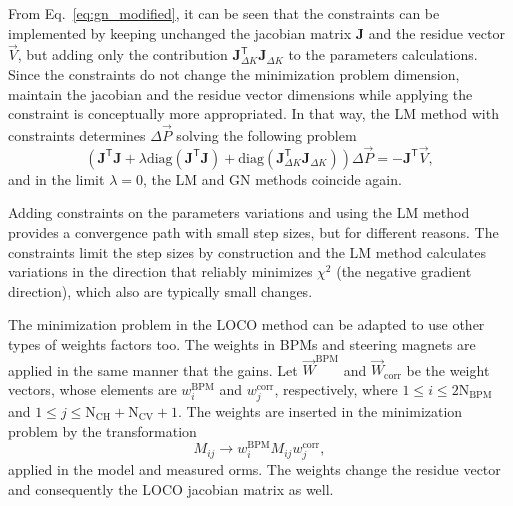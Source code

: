From Eq.~\eqref{eq:gn_modified}, it can be seen that the constraints can be implemented by keeping unchanged the jacobian matrix $\mathbf{J}$ and the residue vector $\vec{V}$, but adding only the contribution $\mathbf{J}^{\mathsf{T}}_{\Delta K}\mathbf{J}_{\Delta K}$ to the parameters calculations. Since the constraints do not change the minimization problem dimension, maintain the jacobian and the residue vector dimensions while applying the constraint is conceptually more appropriated. In that way, the LM method with constraints determines $\Delta \vec{P}$ solving the following problem
\begin{equation}
\left(\mathbf{J}^{\mathsf{T}}\mathbf{J} + \lambda \mathrm{diag}\left(\mathbf{J}^{\mathsf{T}}\mathbf{J}\right) + \mathrm{diag}\left(\mathbf{J}^{\mathsf{T}}_{\Delta K}\mathbf{J}_{\Delta K}\right) \right)\Delta \vec{P} = - \mathbf{J}^{\mathsf{T}}\vec{V},
\label{eq:param_calc}
\end{equation}
and in the limit $\lambda = 0$, the LM and GN methods coincide again.

Adding constraints on the parameters variations and using the LM method provides a convergence path with small step sizes, but for different reasons. The constraints limit the step sizes by construction and the LM method calculates variations in the direction that reliably minimizes $\chi^2$ (the negative gradient direction), which also are typically small changes.

The minimization problem in the LOCO method can be adapted to use other types of weights factors too. The weights in BPMs and steering magnets are applied in the same manner that the gains. Let $\vec{W}^{\mathrm{BPM}}$ and $\vec{W}_{\mathrm{corr}}$ be the weight vectors, whose elements are $w^{\mathrm{BPM}}_{i}$ and $w^{\mathrm{corr}}_{j}$, respectively, where $1 \leq i \leq 2\mathrm{N}_{\mathrm{BPM}}$ and $1 \leq j \leq \mathrm{N}_{\mathrm{CH}} + \mathrm{N}_{\mathrm{CV}} + 1$. The weights are inserted in the minimization problem by the transformation
\begin{equation}
    M_{ij} \rightarrow w^{\mathrm{BPM}}_{i}M_{ij}w^{\mathrm{corr}}_{j}, 
\end{equation}
applied in the model and measured \gls{orm}s. The weights change the residue vector and consequently the LOCO jacobian matrix as well. 



